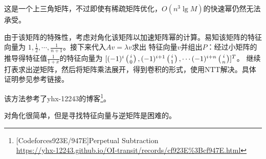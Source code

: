 这是一个上三角矩阵，不过即使有稀疏矩阵优化，$O(n^3\lg M)$的快速幂仍然无法承受。

由于该矩阵的特殊性，考虑对角化该矩阵以加速矩阵幂的计算。易知该矩阵的特征向量为
$1,\frac{1}{2},\cdots,\frac{1}{n+1}$。接下来代入$Av=\lambda v$求出
特征向量$v$并组出$P$：经过小矩阵的推导得特征值$\frac{1}{1+x}$的特征向量为
$[(-1)^i\left(i \atop 0\right),(-1)^{i+1}\left(i \atop 1\right),\cdots (-1)^{i+n}\left(i \atop n\right)]^T$。
继续打表求出逆矩阵，然后将矩阵乘法展开，得到卷积的形式，使用NTT解决。具体证明参见参考链接。

该方法参考了yhx-12243的博客\footnote{
    [Codeforces923E/947E]Perpetual Subtraction\\
    \url{https://yhx-12243.github.io/OI-transit/records/cf923E\%3Bcf947E.html}
}。

对角化很简单，但是寻找特征向量与逆矩阵是困难的。
